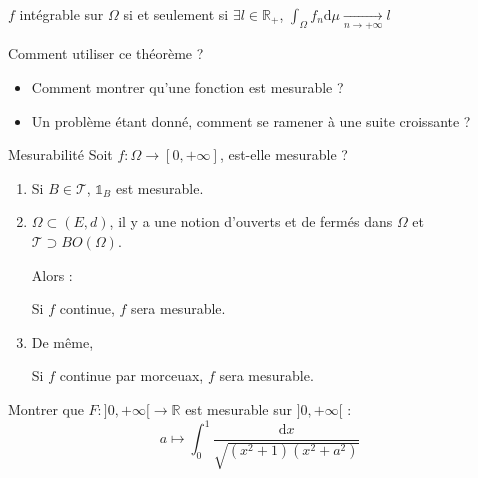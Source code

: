 \begin{Prop}{}{}
$f$ intégrable sur $\Omega$ si et seulement si $\exists l \in \mathbb{R}_+$, $\int_{\Omega}^{}f_n \mathrm{d}\mu  \underset{n \to + \infty}{\longrightarrow} l$
\end{Prop}

\begin{note}{Comment utiliser ce théorème ?}{}

  \begin{itemize}

      \item Comment montrer qu'une fonction est mesurable ? 
      \item Un problème étant donné, comment se ramener à une suite croissante ? 

  \end{itemize}
\end{note}

\begin{Prop}{Mesurabilité}{}
Soit $f : \Omega \to [0, + \infty]$, est-elle mesurable ? 

\begin{enumerate}

    \item Si $B \in \mathcal{T}$, $\mathbb{1}_B$ est mesurable.
    \item $\Omega \subset (E, d)$, il y a une notion d'ouverts et de fermés dans $\Omega$ et $\mathcal{T} \supset BO(\Omega)$. 

      Alors : 
      \begin{center}
      Si $f$ continue, $f$ sera mesurable. 
      \end{center}

    \item De même, 
      \begin{center}
      Si $f$ continue par morceuax, $f$ sera mesurable.
      \end{center}



\end{enumerate}

\end{Prop}




\begin{Example}{}{}
  Montrer que $F : ]0, +\infty[ \to \mathbb{R}$ est mesurable sur $]0, + \infty[$ : 
  \begin{equation}
    a \mapsto \int_{0}^{1} \frac{\mathrm{d}x}{\sqrt{(x ^{2}+1)(x ^{2}+a ^{2})}} 
  \end{equation}
\end{Example}

